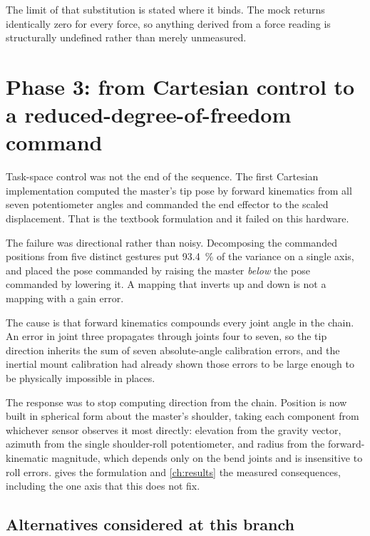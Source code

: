 The limit of that substitution is stated where it binds. The mock returns
identically zero for every force, so anything derived from a force reading is
structurally undefined rather than merely unmeasured.

\section{Phase 3: from Cartesian control to a reduced-degree-of-freedom
command}

Task-space control was not the end of the sequence. The first Cartesian
implementation computed the master's tip pose by forward kinematics from all
seven potentiometer angles and commanded the end effector to the scaled
displacement. That is the textbook formulation and it failed on this hardware.

The failure was directional rather than noisy. Decomposing the commanded
positions from five distinct gestures put \SI{93.4}{\percent} of the variance
on a single axis, and placed the pose commanded by raising the master
\emph{below} the pose commanded by lowering it. A mapping that inverts up and
down is not a mapping with a gain error.

The cause is that forward kinematics compounds every joint angle in the chain.
An error in joint three propagates through joints four to seven, so the tip
direction inherits the sum of seven absolute-angle calibration errors, and the
inertial mount calibration had already shown those errors to be large enough
to be physically impossible in places.

The response was to stop computing direction from the chain. Position is now
built in spherical form about the master's shoulder, taking each component
from whichever sensor observes it most directly: elevation from the gravity
vector, azimuth from the single shoulder-roll potentiometer, and radius from
the forward-kinematic magnitude, which depends only on the bend joints and is
insensitive to roll errors.  gives the formulation and
\cref{ch:results} the measured consequences, including the one axis that this
does not fix.

\subsection{Alternatives considered at this branch}

